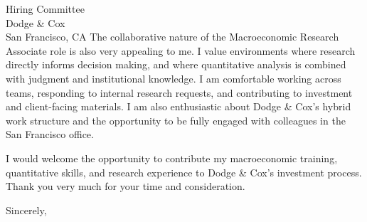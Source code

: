 \documentclass[11pt,letterpaper]{letter}
\begin{document}
\begin{letter}{
Hiring Committee \\
Dodge \& Cox \\
San Francisco, CA
}
The collaborative nature of the Macroeconomic Research Associate role is also very appealing to me. I value environments where research directly informs decision making, and where quantitative analysis is combined with judgment and institutional knowledge. I am comfortable working across teams, responding to internal research requests, and contributing to investment and client-facing materials. I am also enthusiastic about Dodge \& Cox’s hybrid work structure and the opportunity to be fully engaged with colleagues in the San Francisco office.

I would welcome the opportunity to contribute my macroeconomic training, quantitative skills, and research experience to Dodge \& Cox’s investment process. Thank you very much for your time and consideration.

\closing{Sincerely,}

\end{letter}
\end{document}
